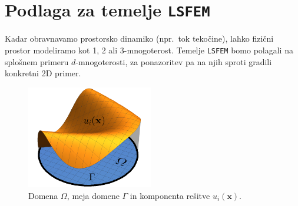 \section{Podlaga za temelje \texttt{LSFEM}}

Kadar obravnavamo prostorsko dinamiko (npr.\ tok tekočine), lahko fizični prostor modeliramo kot 1, 2 ali 3-mnogoterost. Temelje \texttt{LSFEM} bomo polagali na splošnem primeru $d$-mnogoterosti, za ponazoritev pa na njih sproti gradili konkretni 2D primer.

\begin{figure}
	\vspace{-0.3cm}
	\centering
	\captionsetup{type=figure}
	\includegraphics[width=5.5cm]{Slike/funkcijaInDomenaG}
	\caption{Domena $\Omega$, meja domene $\Gamma$ in komponenta rešitve $u_i(\mathbf{x})$.}
\label{fig:funkInDom}
\vspace{0.2cm}
\end{figure}

